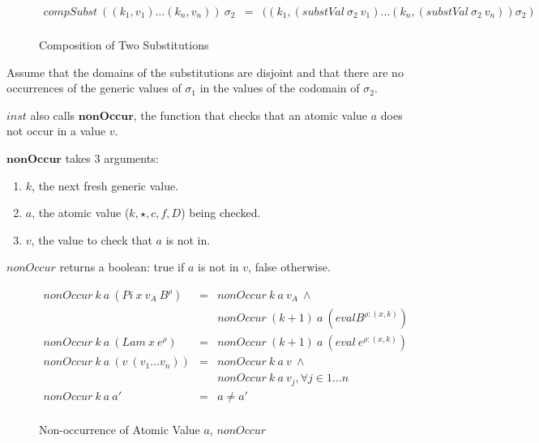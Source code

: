 \begin{figure}[H]
  \begin{equation*}
    \begin{aligned}
      compSubst \: ((k_1,v_1) \dots (k_n,v_n)) \: \sigma_2 & = & ((k_1, (substVal \: \sigma_2 \: v_1) \dots (k_n,(substVal \: \sigma_2 \: v_n)) \sigma_2) \\
    \end{aligned}
  \end{equation*}
  \caption{Composition of Two Substitutions}
\end{figure}

Assume that the domains of the substitutions are disjoint and that there are no occurrences of the generic values of $\sigma_1$ in the values of the codomain of $\sigma_2$.

$inst$ also calls $\boldsymbol{nonOccur}$, the function that checks that an atomic value $a$ does not occur in a value $v$.

$\boldsymbol{nonOccur}$ takes 3 arguments:

\begin{enumerate}
  \item $k$, the next fresh generic value.
  \item $a$, the atomic value ($k, \star, c, f, D$) being checked.
  \item $v$, the value to check that $a$ is not in.
\end{enumerate}

$nonOccur$ returns a boolean: true if $a$ is not in $v$, false otherwise.

\begin{figure}[H]
  \begin{equation*}
    \begin{aligned}
      nonOccur \: k \: a \: (Pi \: x \: v_A \: B^{\rho}) & = & nonOccur \: k \: a \: v_A \: \land                   \\
                                                         &   & nonOccur \: (k+1) \: a \: (eval B^{\rho:(x,k)})      \\
      nonOccur \: k \: a \: (Lam \: x \: e^{\rho})       & = & nonOccur \: (k+1) \: a \: (eval \: e^{\rho:(x,k)})   \\
      nonOccur \: k \: a \: (v \: (v_1 \dots v_n))       & = & nonOccur \: k \: a \: v \: \land                     \\
                                                         &   & nonOccur \: k \: a \: v_j, \forall j \in {1 \dots n} \\
      nonOccur \: k \: a \: a'                           & = & a \neq a'                                            \\
    \end{aligned}
  \end{equation*}
  \caption{Non-occurrence of Atomic Value $a$, $nonOccur$}
  \label{fig:nonOccur}
\end{figure}

